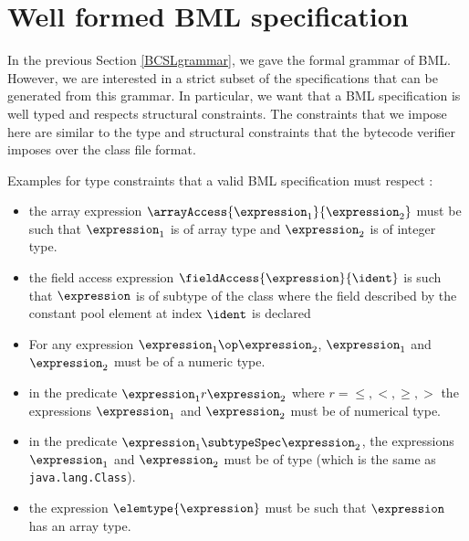
\newcommand{\getType}{\mbox{\rm\textsf{getType}}}
\newcommand{\constType}{\mbox{\rm\textsf{constType}}}
\newcommand{\getClass}{\mbox{\rm\textsf{getClass}}}
\newcommand{\application}{\mbox{\rm\textbf{CLS}}}
 
\section{Well formed BML specification}\label{BML:wf}
In the previous Section \ref{BCSLgrammar}, we gave the formal grammar of BML.
However, we are interested in a strict subset of 
the specifications that can be generated from this grammar. In particular, we want that a
BML specification is well typed and respects structural constraints.
The constraints that we impose here are similar to the type and structural constraints
that the bytecode verifier imposes over the class file format.

Examples for type constraints that  a valid BML specification must respect : 
\begin{itemize}
    \item  the array expression $\arrayAccess{\expression_1}{\expression_2}$ must be such that 
$\expression_1$ is of array type and $\expression_2$  is of integer type.

    \item the field access expression  $\fieldAccess{\expression}{\ident}$ is such that $\expression$ is of subtype
    of the class where the field described by the constant pool element at index $\ident$ is declared
    \item For any expression $ \expression_1 \op \expression_2$,  $ \expression_1$ and $ \expression_2$ must be of
          a numeric type.
    
    \item in the predicate $\expression_1 r \expression_2$ where $r =  \leq,<,\geq, >$  the expressions  $\expression_1$ and 
          $\expression_2$ must be of numerical type.

     \item  in the predicate $\expression_1  \subtypeSpec \expression_2$, the expressions $\expression_1$
            and  $\expression_2$ must be of type \TYPE (which is the same as \texttt{java.lang.Class}).

     \item the expression $\elemtype{\expression}$ must be such that $\expression$ has an array type.
	    
     

	  
 \end{itemize}

